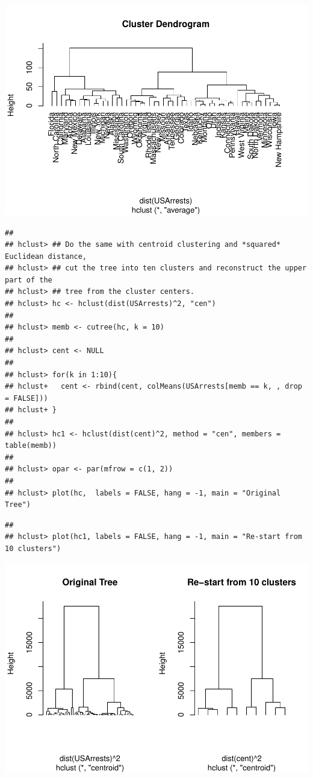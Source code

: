 \documentclass[
]{book}
\begin{document}
\includegraphics{bookdown-demo_files/figure-latex/unnamed-chunk-12-2.pdf}

\begin{verbatim}
## 
## hclust> ## Do the same with centroid clustering and *squared* Euclidean distance,
## hclust> ## cut the tree into ten clusters and reconstruct the upper part of the
## hclust> ## tree from the cluster centers.
## hclust> hc <- hclust(dist(USArrests)^2, "cen")
## 
## hclust> memb <- cutree(hc, k = 10)
## 
## hclust> cent <- NULL
## 
## hclust> for(k in 1:10){
## hclust+   cent <- rbind(cent, colMeans(USArrests[memb == k, , drop = FALSE]))
## hclust+ }
## 
## hclust> hc1 <- hclust(dist(cent)^2, method = "cen", members = table(memb))
## 
## hclust> opar <- par(mfrow = c(1, 2))
## 
## hclust> plot(hc,  labels = FALSE, hang = -1, main = "Original Tree")
\end{verbatim}

\begin{verbatim}
## 
## hclust> plot(hc1, labels = FALSE, hang = -1, main = "Re-start from 10 clusters")
\end{verbatim}

\includegraphics{bookdown-demo_files/figure-latex/unnamed-chunk-12-3.pdf}
\end{document}
